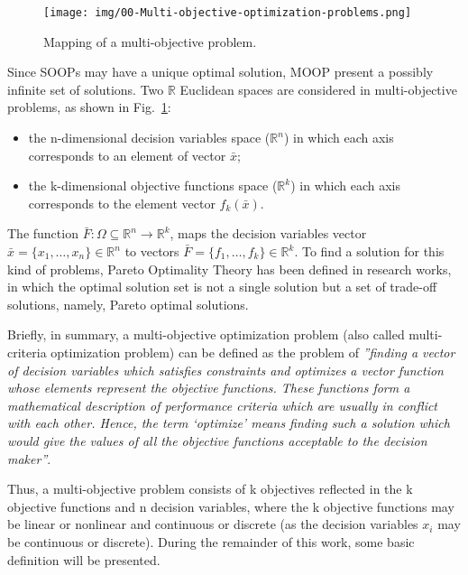 %
\begin{figure}[htbp]
	\centerline{\texttt{[image: img/00-Multi-objective-optimization-problems.png]}}
	\caption{Mapping of a multi-objective problem.}
	\label{fig_multiobjmapp}
\end{figure}
%
Since SOOPs may have a unique optimal solution, MOOP present a possibly infinite set of solutions. Two $\mathbb{R}$ Euclidean spaces are considered in multi-objective problems, as shown in Fig.~\ref{fig_multiobjmapp}:
%
\begin{itemize}
    \item  the n-dimensional decision variables space ($\mathbb{R}^n$) in which each axis corresponds to an element of vector $\bar x$;
    \item the k-dimensional objective functions space ($\mathbb{R}^k$) in which each axis corresponds to the element vector $f_k(\bar x)$.
\end{itemize}
%
The function $ \bar F : \Omega \subseteq \mathbb{R}^{n} \to \mathbb{R}^k$, maps the decision variables vector $\bar x = \{x_1,\ldots, x_n\} \in \mathbb{R}^n$ to vectors $\bar F = \{f_1,\ldots, f_k\} \in \mathbb{R}^k$. To find a solution for this kind of problems, Pareto Optimality Theory \cite{bib3} has been defined in research works, in which the optimal solution set is not a single solution but a set of trade-off solutions, namely, Pareto optimal solutions. \par
%
Briefly, in summary, a multi-objective optimization problem (also called multi-criteria optimization problem) can be defined as the problem of \cite{bib5} \textit{''finding a vector of decision variables which satisfies constraints and optimizes a vector function whose elements represent the objective functions. These functions form a mathematical description of performance criteria which are usually in conflict with each other. Hence, the term ‘optimize’ means finding such a solution which would give the values of all the objective functions acceptable to the decision maker''}. \par
Thus, a multi-objective problem consists of k objectives reflected in the k objective functions and n decision variables, where the k objective functions may be linear or nonlinear and continuous or discrete (as the decision variables $x_i$ may be continuous or discrete). During the remainder of this 
work, some basic definition will be presented. \par
%
